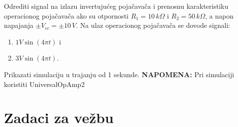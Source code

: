 \begin{zadatak}
    Odrediti signal na izlazu invertujućeg pojačavača i prenosnu karakteristiku operacionog pojačavača ako su otpornosti $R_1 = 10 \,k\Omega$ i $R_2 = 50 \,k\Omega$, a napon napajanja $\pm V_{cc} = \pm 10\,V$. Na ulaz operacionog pojačavača se dovode signali:
    \begin{enumerate}
        \item[a)] $1V\sin{(4 \pi t)}$ i
        
        \item[b)] $3V\sin{(4 \pi t)}$.
    \end{enumerate}
    Prikazati simulaciju u trajanju od 1 sekunde.\newline
    \textbf{NAPOMENA:} Pri simulaciji koristiti UniversalOpAmp2
\end{zadatak}

\pagebreak
\section{Zadaci za vežbu}

